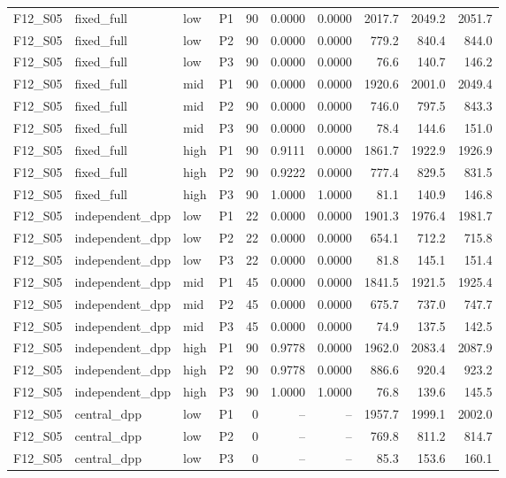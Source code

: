 \begin{longtable}{llllrrrrrr}
F12\_S05 & fixed\_full & low & P1 & 90 & 0.0000 & 0.0000 & 2017.7 & 2049.2 & 2051.7 \\
F12\_S05 & fixed\_full & low & P2 & 90 & 0.0000 & 0.0000 & 779.2 & 840.4 & 844.0 \\
F12\_S05 & fixed\_full & low & P3 & 90 & 0.0000 & 0.0000 & 76.6 & 140.7 & 146.2 \\
F12\_S05 & fixed\_full & mid & P1 & 90 & 0.0000 & 0.0000 & 1920.6 & 2001.0 & 2049.4 \\
F12\_S05 & fixed\_full & mid & P2 & 90 & 0.0000 & 0.0000 & 746.0 & 797.5 & 843.3 \\
F12\_S05 & fixed\_full & mid & P3 & 90 & 0.0000 & 0.0000 & 78.4 & 144.6 & 151.0 \\
F12\_S05 & fixed\_full & high & P1 & 90 & 0.9111 & 0.0000 & 1861.7 & 1922.9 & 1926.9 \\
F12\_S05 & fixed\_full & high & P2 & 90 & 0.9222 & 0.0000 & 777.4 & 829.5 & 831.5 \\
F12\_S05 & fixed\_full & high & P3 & 90 & 1.0000 & 1.0000 & 81.1 & 140.9 & 146.8 \\
F12\_S05 & independent\_dpp & low & P1 & 22 & 0.0000 & 0.0000 & 1901.3 & 1976.4 & 1981.7 \\
F12\_S05 & independent\_dpp & low & P2 & 22 & 0.0000 & 0.0000 & 654.1 & 712.2 & 715.8 \\
F12\_S05 & independent\_dpp & low & P3 & 22 & 0.0000 & 0.0000 & 81.8 & 145.1 & 151.4 \\
F12\_S05 & independent\_dpp & mid & P1 & 45 & 0.0000 & 0.0000 & 1841.5 & 1921.5 & 1925.4 \\
F12\_S05 & independent\_dpp & mid & P2 & 45 & 0.0000 & 0.0000 & 675.7 & 737.0 & 747.7 \\
F12\_S05 & independent\_dpp & mid & P3 & 45 & 0.0000 & 0.0000 & 74.9 & 137.5 & 142.5 \\
F12\_S05 & independent\_dpp & high & P1 & 90 & 0.9778 & 0.0000 & 1962.0 & 2083.4 & 2087.9 \\
F12\_S05 & independent\_dpp & high & P2 & 90 & 0.9778 & 0.0000 & 886.6 & 920.4 & 923.2 \\
F12\_S05 & independent\_dpp & high & P3 & 90 & 1.0000 & 1.0000 & 76.8 & 139.6 & 145.5 \\
F12\_S05 & central\_dpp & low & P1 & 0 & -- & -- & 1957.7 & 1999.1 & 2002.0 \\
F12\_S05 & central\_dpp & low & P2 & 0 & -- & -- & 769.8 & 811.2 & 814.7 \\
F12\_S05 & central\_dpp & low & P3 & 0 & -- & -- & 85.3 & 153.6 & 160.1 \\

\end{longtable}
